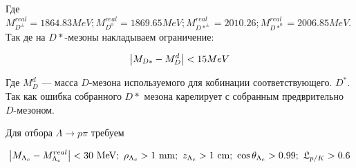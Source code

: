 Где $M^{real}_{D^\pm} = 1864.83 MeV; M^{real}_{D^0} = 1869.65 MeV; 
M^{real}_{D*^\pm} = 2010.26;  M^{real}_{D*^0} = 2006.85 MeV$. 
Так де на $D*$-мезоны накладываем ограничение:

\begin{equation}
        \abs{M_{D*} - M^d_{D}} < 15 MeV
\end{equation}

Где $ M^d_{D}$ --- масса $D$-мезона используемого для кобинации соответствующего. 
$D^*$. Так как ошибка собранного $D*$ мезона карелирует с собранным 
предврительно $D$-мезоном.

\newdot Для отбора $\Lambda \to p \pi$ требуем 

$$
\abs{ M_{\Lambda_c} - M^{real}_{\Lambda_c} } < 30 \text{ MeV}; 
\ \rho_{\Lambda_c} > 1 \text{ mm}; \ z_{\Lambda_c} > 1 \text{ cm}; 
\ \cos \theta_{\Lambda_c} > 0.99;
\ \mathfrak{L}_{p/K } > 0.6 
$$
